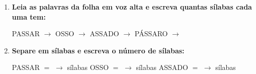 \begin{exercicio}
\begin{enumerate}[resume]
  \item \textbf{Leia as palavras da folha em voz alta e escreva quantas sílabas cada uma tem:}

  \begin{center}
  PASSAR $\rightarrow$ \underline{\hspace{1cm}} \quad OSSO $\rightarrow$ \underline{\hspace{1cm}} \quad ASSADO $\rightarrow$ \underline{\hspace{1cm}} \quad PÁSSARO $\rightarrow$ \underline{\hspace{1cm}}
  \end{center}

  \item \textbf{Separe em sílabas e escreva o número de sílabas:}
  \begin{center}
  PASSAR $=$ \underline{\hspace{1.2cm}} $\rightarrow$ \underline{\hspace{0.8cm}} sílabas \quad OSSO $=$ \underline{\hspace{1.2cm}} $\rightarrow$ \underline{\hspace{0.8cm}} sílabas \quad ASSADO $=$ \underline{\hspace{1.2cm}} $\rightarrow$ \underline{\hspace{0.8cm}} sílabas
  \end{center}

\end{enumerate}

\end{exercicio}



